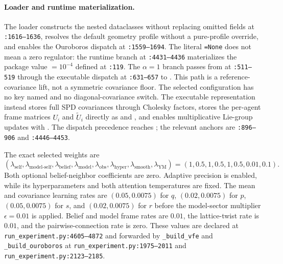 \paragraph{Loader and runtime materialization.}
The loader constructs the nested dataclasses without replacing omitted fields at \allowbreak\texttt{:1616--1636}, resolves the default geometry profile without a pure-profile override, and enables the Ouroboros dispatch at \allowbreak\texttt{:1559--1694}.
The literal \allowbreak\texttt{=None} does not mean a zero regulator: the runtime branch at \allowbreak\texttt{:4431--4436} materializes the package value  $=10^{-4}$ defined at \allowbreak{}\allowbreak\texttt{:119}.
The $\alpha=1$ branch passes from  at \allowbreak{}\allowbreak\texttt{:511--519} through the executable dispatch at \allowbreak{}\allowbreak\texttt{:631--657} to .
This path is a reference-covariance lift, not a symmetric covariance floor.
The selected configuration has no key named  and no diagonal-covariance switch.
The executable representation instead stores full SPD covariances through Cholesky factors, stores the per-agent frame matrices $U_i$ and $\widetilde U_i$ directly as  and , and enables multiplicative Lie-group updates with .
The dispatch precedence reaches ; the relevant anchors are \allowbreak\texttt{:896--906} and \allowbreak\texttt{:4446--4453}.

The exact selected weights are
\begin{equation}
 (\lambda_{\mathrm{self}},\lambda_{\mathrm{model\text{-}self}},
 \lambda_{\mathrm{belief}},\lambda_{\mathrm{model}},\lambda_{\mathrm{obs}},
 \lambda_{\mathrm{hyper}},\lambda_{\mathrm{smooth}},\lambda_{\mathrm{YM}})
 = (1,0.5,1,0.5,1,0.5,0.01,0.1).
\end{equation}
Both optional belief-neighbor coefficients are zero. Adaptive precision is enabled, while its hyperparameters and both attention temperatures are fixed. The mean and covariance learning rates are $(0.05,0.0075)$ for $q$, $(0.02,0.0075)$ for $p$, $(0.05,0.0075)$ for $s$, and $(0.02,0.0075)$ for $r$ before the model-sector multiplier $\epsilon=0.01$ is applied. Belief and model frame rates are $0.01$, the lattice-twist rate is $0.01$, and the pairwise-connection rate is zero. These values are declared at \texttt{run\_experiment.py:4605--4872} and forwarded by \texttt{\_build\_vfe} and \texttt{\_build\_ouroboros} at \texttt{run\_experiment.py:1975--2011} and \texttt{run\_experiment.py:2123--2185}.

